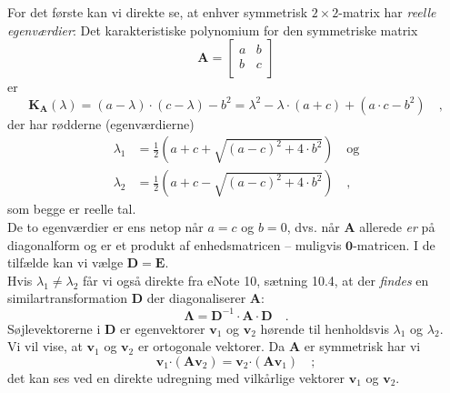 \begin{bevis}
For det første kan vi direkte se, at enhver  symmetrisk $2 \times 2$-matrix har {\textit{reelle egenværdier}}: Det karakteristiske polynomium for den symmetriske matrix
\begin{equation}
\mathbf{A} = \left[
               \begin{array}{cc}
                 a & b \\
                 b & c \\
               \end{array}
             \right]
\end{equation}
 er
\begin{equation}
\mathbf{K}_{\mathbf{A}}(\lambda) = (a-\lambda)\cdot(c-\lambda) - b^{2} = \lambda^{2} - \lambda\cdot (a + c) + (a\cdot c - b^{2})  \quad ,
\end{equation}
der har rødderne (egenværdierne)
\begin{equation}
\begin{aligned}
\lambda_{1} &= \frac{1}{2}\left(a + c + \sqrt{(a-c)^{2} + 4\cdot b^{2} }  \right)  \quad \textrm{og} \\  \lambda_{2} &=   \frac{1}{2}\left(a + c - \sqrt{(a-c)^{2} + 4\cdot b^{2}} \right) \quad ,
\end{aligned}
\end{equation}
som begge er reelle tal. \\

De to egenværdier er ens netop når $a=c$ og $b=0$, dvs. når $\mathbf{A}$ allerede {\textit{er}} på diagonalform
og er et produkt af enhedsmatricen -- muligvis $\mathbf{0}$-matricen. I de tilfælde kan vi vælge $\mathbf{D}= \mathbf{E}$. \\

Hvis $\lambda_{1} \neq \lambda_{2}$ får vi også direkte fra eNote 10, sætning 10.4, at der {\textit{findes}} en similartransformation $\mathbf{D}$ der diagonaliserer $\mathbf{A}$:
\begin{equation}
\bm{\Lambda} = \mathbf{D}^{-1}\cdot \mathbf{A}\cdot \mathbf{D} \quad .
\end{equation}
Søjlevektorerne i $\mathbf{D}$ er egenvektorer $\mathbf{v}_{1}$ og $\mathbf{v}_{2}$ hørende til henholdsvis $\lambda_{1}$ og  $\lambda_{2}$.\\

Vi vil vise, at $\mathbf{v}_{1}$ og $\mathbf{v}_{2}$ er ortogonale vektorer. Da $\mathbf{A}$ er symmetrisk har vi
\begin{equation} \label{eqSymmetriskA}
\mathbf{v}_{1}\bm{\cdot} \left(\mathbf{A} \mathbf{v}_{2}\right)  = \mathbf{v}_{2}\bm{\cdot} \left(\mathbf{A} \mathbf{v}_{1} \right) \quad;
\end{equation}
det kan ses ved en direkte udregning med vilkårlige vektorer $\mathbf{v}_{1}$ og $\mathbf{v}_{2}$.


\end{bevis}
